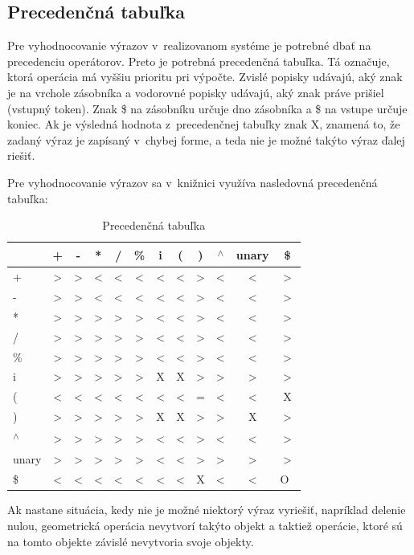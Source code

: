 \subsection*{Precedenčná tabuľka}
Pre vyhodnocovanie výrazov v~realizovanom systéme je potrebné dbať na precedenciu operátorov. Preto je potrebná precedenčná tabuľka. Tá označuje, ktorá operácia má vyššiu prioritu pri výpočte. Zvislé popisky udávajú, aký znak je na vrchole zásobníka a vodorovné popisky udávajú, aký znak práve prišiel (vstupný token). Znak \$ na zásobníku určuje dno zásobníka a \$ na vstupe určuje koniec. Ak je výsledná hodnota z~precedenčnej tabuľky znak X, znamená to, že zadaný výraz je zapísaný v~chybej forme, a teda nie je možné takýto výraz ďalej riešiť.

Pre vyhodnocovanie výrazov sa v~knižnici využíva nasledovná precedenčná tabuľka: \nopagebreak
\begin{table}[H]
\centering
\begin{tabular}{ |m{1cm}||c c c c c c c c c c c |}
\hline
&+ & - & * & / & \% & i & ( & ) & \textsuperscript{$\wedge$} & unary & \$   \\
\hline
\hline
+ & > & > & < & < & < & < & < & > & < & < & >          \\
- & > & > & < & < & < & < & < & > & < & < & >          \\
* & > & > & > & > & > & < & < & > & < & < & >          \\
/ & > & > & > & > & > & < & < & > & < & < & >          \\
\% & > & > & > & > & > & < & < & > & < & < & >          \\
i & > & > & > & > & > & X & X & > & > & > & >          \\
( & < & < & < & < & < & < & < & = & < & < & X          \\
) & > & > & > & > & > & X & X & > & > & X & >          \\
\textsuperscript{$\wedge$} & > & > & > & > & > & < & < & > & < & < & > \\
unary & > & > & > & > & > & < & < & > & > & > & >      \\
\$ & < & < & < & < & < & < & < & X & < & < & O~\\
\hline
\end{tabular}
\caption{\label{tab:precedenceTable}Precedenčná tabuľka}
\end{table}


Ak nastane situácia, kedy nie je možné niektorý výraz vyriešiť, napríklad delenie nulou, geometrická operácia nevytvorí takýto objekt a taktiež operácie, ktoré sú na tomto objekte závislé nevytvoria svoje objekty.

